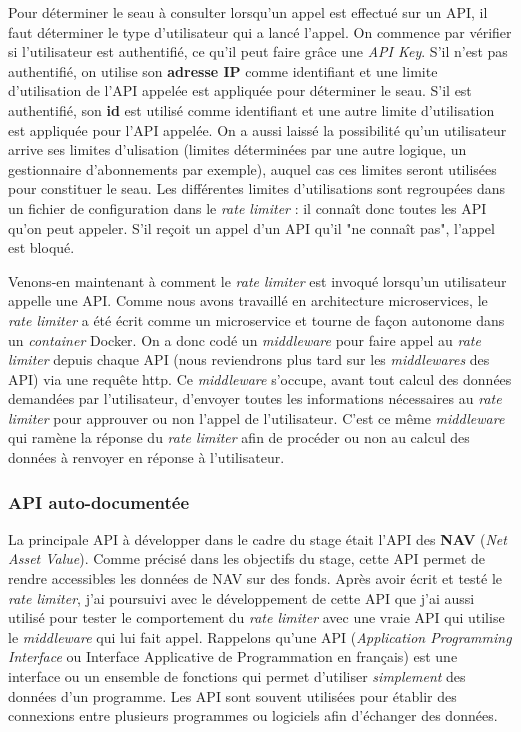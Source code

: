 Pour déterminer le seau à consulter lorsqu'un appel est effectué sur un API, il faut déterminer le type d'utilisateur qui a lancé l'appel. On commence par vérifier si l'utilisateur est authentifié, ce qu'il peut faire grâce une \textit{API Key}. S'il n'est pas authentifié, on utilise son \textbf{adresse IP} comme identifiant et une limite d'utilisation de l'API appelée est appliquée pour déterminer le seau. S'il est authentifié, son \textbf{id} est utilisé comme identifiant et une autre limite d'utilisation est appliquée pour l'API appelée. On a aussi laissé la possibilité qu'un utilisateur arrive ses limites d'ulisation (limites déterminées par une autre logique, un gestionnaire d'abonnements par exemple), auquel cas ces limites seront utilisées pour constituer le seau. Les différentes limites d'utilisations sont regroupées dans un fichier de configuration dans le \textit{rate limiter} : il connaît donc toutes les API qu'on peut appeler. S'il reçoit un appel d'un API qu'il "ne connaît pas", l'appel est bloqué.

\vspace{3mm}

Venons-en maintenant à comment le \textit{rate limiter} est invoqué lorsqu'un utilisateur appelle une API. Comme nous avons travaillé en architecture microservices, le \textit{rate limiter} a été écrit comme un microservice et tourne de façon autonome dans un \textit{container} Docker. On a donc codé un \textit{middleware} pour faire appel au \textit{rate limiter} depuis chaque API (nous reviendrons plus tard sur les \textit{middlewares} des API) via une requête http. Ce \textit{middleware} s'occupe, avant tout calcul des données demandées par l'utilisateur, d'envoyer toutes les informations nécessaires au \textit{rate limiter} pour approuver ou non l'appel de l'utilisateur. C'est ce même \textit{middleware} qui ramène la réponse du \textit{rate limiter} afin de procéder ou non au calcul des données à renvoyer en réponse à l'utilisateur.



\subsubsection{API auto-documentée}
La principale API à développer dans le cadre du stage était l'API des \textbf{NAV} (\textit{Net Asset Value}). Comme précisé dans les objectifs du stage, cette API permet de rendre accessibles les données de NAV sur des fonds. Après avoir écrit et testé le \textit{rate limiter}, j'ai poursuivi avec le développement de cette API que j'ai aussi utilisé pour tester le comportement du \textit{rate limiter} avec une vraie API qui utilise le \textit{middleware} qui lui fait appel. Rappelons qu'une API (\textit{Application Programming Interface} ou Interface Applicative de Programmation en français) est une interface ou un ensemble de fonctions qui permet d'utiliser \emph{simplement} des données d'un programme. Les API sont souvent utilisées pour établir des connexions entre plusieurs programmes ou logiciels afin d'échanger des données.

